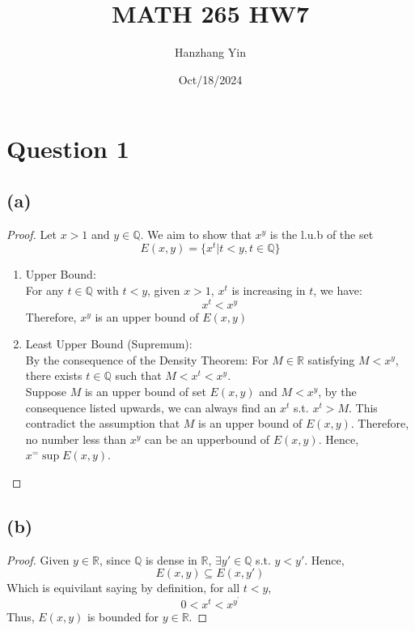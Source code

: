 \documentclass{article}
\title{MATH 265 HW7}
\author{Hanzhang Yin}
\date{Oct/18/2024}
\begin{document}
\maketitle

\section*{Question 1}

\subsection*{(a)}
\begin{proof}
    Let $x > 1$ and $y \in \mathbb{Q}$. We aim to show that $x^y$ is the l.u.b of the set
    \[ E(x, y) = \{ x^t | t < y, t \in \mathbb{Q} \} \]
    \begin{enumerate}
        \item Upper Bound: 
        \\
        For any $t \in \mathbb{Q}$ with $t < y$, given $x > 1$, $x^t$ is increasing in $t$, we have:
        \[ x^t < x^y \]
        Therefore, $x^y$ is an upper bound of $E(x, y)$
        \item Least Upper Bound (Supremum): 
        \\
        By the consequence of the Density Theorem: For $M \in \mathbb{R}$ satisfying $M < x^y$, there exists $t \in \mathbb{Q}$ such that $M < x^t < x^y$.
        \\
        Suppose $M$ is an upper bound of set $E(x,y)$ and $M < x^y$, by the consequence listed upwards, we can always find an $x^t$ s.t. $x^t > M$. This contradict the assumption that
        $M$ is an upper bound of $E(x, y)$. Therefore, no number less than $x^y$ can be an upperbound of $E(x,y)$. Hence, $x^ = \sup E(x, y)$.
    \end{enumerate}
\end{proof}

\subsection*{(b)}
\begin{proof}
    Given $y \in \mathbb{R}$, since $\mathbb{Q}$ is dense in $\mathbb{R}$, $\exists y' \in \mathbb{Q}$ s.t. $y < y'$.
    Hence,
    \[ E(x, y) \subseteq E(x, y') \]
    Which is equivilant saying by definition, for all $t < y$,
    \[ 0 < x^t < x^y^' \]
    Thus, $E(x, y)$ is bounded for $y \in \mathbb{R}$.
\end{proof}
\end{document}
